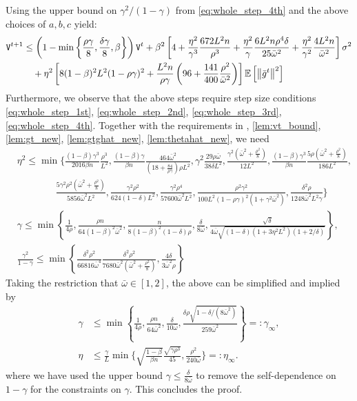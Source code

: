 \documentclass[10pt]{article} %
\theoremstyle{plain}
\theoremstyle{definition}
\theoremstyle{remark}
\newcommand{\bw}{\bar{\omega}}
\newcommand{\avgg}{\bar{g}}
\newcommand{\norm}[1]{\left\| #1 \right\|}
\newcommand{\nl}{\nonumber\\}
\newcommand{\ER}{{\tt V}}
\newcommand{\redtmp}{}
\begin{document}
Using the upper bound on $\gamma^2/(1-\gamma)$ from \eqref{eq:whole_step_4th} and the above choices of $a,b,c$ yield:
\begin{align*}
    \ER^{t+1} & \leq \left( 1- \min \left\{ \frac{\rho\gamma}{8}, \frac{\delta\gamma}{8}, \beta \right\}\right) \ER^t  + \beta^2 \left[4 + \frac{\eta^2}{\gamma^3}\frac{672L^2 n}{\rho^3} + \frac{\eta^2}{\gamma} \frac{6 L^2 n \rho^4 \delta}{25 \bw^2} + \frac{\eta^2}{\gamma^2} \frac{4 L^2 n}{\bw^2} \right] \sigma^2
    \nl &\quad + \eta^2 \left[ 8(1-\beta)^2 L^2 (1-\rho\gamma)^2 + \frac{L^2 n}{\rho \gamma} \left( 96 + \frac{141}{400} \frac{\rho^2}{\bw^2} \right) \right] \mathbb{E}\left[ \norm{\avgg^t}^2 \right]
\end{align*}
Furthermore, we observe that the above steps require step size conditions \eqref{eq:whole_step_1st}, \eqref{eq:whole_step_2nd}, \eqref{eq:whole_step_3rd}, \eqref{eq:whole_step_4th}. Together with the requirements in , \ref{lem:vt_bound}, \ref{lem:gt_new}, \ref{lem:gtghat_new}, \ref{lem:thetahat_new}, we need
\begin{align*}
    &\eta^2 \leq \min \bigg\{
    \frac{(1-\beta)\gamma^3}{2016\beta n}\frac{\rho^3}{L^2},
    \frac{(1-\beta)\gamma}{\beta n}  \frac{464\bw^2}{(18+\frac{84}{\rho\gamma})\rho L^2},
    \gamma^2 \frac{29 \rho\bw}{38\delta L^2},
    \frac{\gamma^2(\bw^2 + \frac{\rho^2}{8})}{12 L^2}, 
    \frac{(1-\beta)\gamma^3}{\beta n} \frac{5\rho(\bw^2 + \frac{\rho^2}{8})}{186 L^2}, 
    \\
    &\quad \quad \quad \quad \frac{5 \gamma^2  \rho^2(\bw^2+\frac{\rho^2}{8})}{5856 \bw^2 L^2}, \frac{\gamma^2\rho^2}{624(1-\delta)L^2},
    \frac{\gamma^2\rho^4}{57600\bw^2L^2}, \frac{ \rho^2 \gamma^2 }{ 100 L^2 (1-\rho\gamma)^2 ( 1 + \gamma^2 \bw^2)}, \frac{ \delta^2 \rho }{ 1248 \bw^2 L^2 \gamma }
    \bigg\}
    \nl 
    &\gamma \leq \min \left\{ 
    \frac{1}{4\rho}, 
    \frac{\rho n}{64(1-\beta)^2\bw^2},
    \frac{n}{8(1-\beta)^2(1-\delta)\rho}, \frac{ \delta}{8 \bw}, \frac{ \sqrt{\delta}} {4 \bw \sqrt{(1-\delta)(1+3 \eta^2 L^2)(1 + 2/\delta)}}
    \right\}
    , \nl 
    & \frac{\gamma^2}{1-\gamma} \leq \min \left\{ 
    \frac{\delta^2\rho^2}{66816\bw^4}
    \frac{\delta^2\rho^2}{7680 \bw^2 (\bw^2 + \frac{\rho^2}{8})},
    \frac{4\delta}{3\bw^2\rho}
    \right\}
\end{align*}
Taking the restriction that $\bw \in [1,2]$, the above can be simplified and implied by 
\begin{align*}
    \gamma & \leq \min \left\{ \frac{1}{4 \rho}, \frac{\rho n}{64 \bw^2}, \frac{ \delta}{10 \bw}, \frac{\delta \rho {\redtmp \sqrt{1-\delta/(8 \bw^2)}} }{259 \bw^2} \right\} =: \gamma_\infty , \\
    \eta & \leq \frac{\gamma}{L}  \min \bigg\{
        \sqrt{\frac{1-\beta}{\beta n}}\frac{\sqrt{ \gamma \rho^3} }{45} , \frac{\rho^2}{240 \bw }
    \bigg\} =: \eta_\infty .
\end{align*}
{\redtmp where we have used the upper bound $\gamma \leq \frac{\delta}{8 \bw}$ to remove the self-dependence on $1-\gamma$ for the constraints on $\gamma$.} This concludes the proof.
\end{document}
